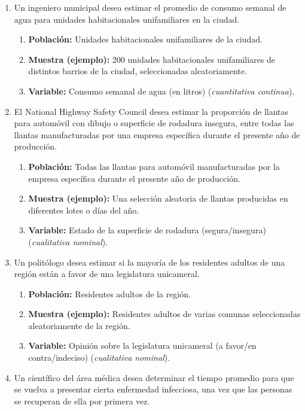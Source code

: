 \documentclass[12pt, letterpaper]{article}
\begin{document}
\begin{enumerate}
    \item Un ingeniero municipal desea estimar el promedio de consumo semanal de agua para unidades habitacionales unifamiliares en la ciudad.
        \begin{enumerate}
            \item \textbf{Población:} Unidades habitacionales unifamiliares de la ciudad.
            \item \textbf{Muestra (ejemplo):} 200 unidades habitacionales unifamiliares de distintos barrios de la ciudad, seleccionadas aleatoriamente.
            \item \textbf{Variable:} Consumo semanal de agua (en litros) (\textit{cuantitativa continua}).
        \end{enumerate}
    \item El National Highway Safety Council desea estimar la proporción de llantas para automóvil con dibujo o superficie de rodadura insegura, entre todas las llantas manufacturadas por una empresa específica durante el presente año de producción.
        \begin{enumerate}
            \item \textbf{Población:} Todas las llantas para automóvil manufacturadas por la empresa específica durante el presente año de producción.
            \item \textbf{Muestra (ejemplo):} Una selección aleatoria de llantas producidas en diferentes lotes o días del año.
            \item \textbf{Variable:} Estado de la superficie de rodadura (segura/insegura) (\textit{cualitativa nominal}).
        \end{enumerate}
    \item Un politólogo desea estimar si la mayoría de los residentes adultos de una región están a favor de una legislatura unicameral.
        \begin{enumerate}
            \item \textbf{Población:} Residentes adultos de la región.
            \item \textbf{Muestra (ejemplo):} Residentes adultos de varias comunas seleccionadas aleatoriamente de la región.
            \item \textbf{Variable:} Opinión sobre la legislatura unicameral (a favor/en contra/indeciso) (\textit{cualitativa nominal}).
        \end{enumerate}
    \item Un científico del área médica desea determinar el tiempo promedio para que se vuelva a presentar cierta enfermedad infecciosa, una vez que las personas se recuperan de ella por primera vez.

\end{enumerate}
\end{document}
